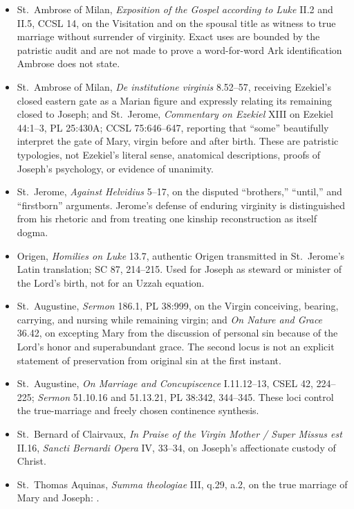 \begin{itemize}
  \item St.~Ambrose of Milan, \emph{Exposition of the Gospel according to Luke} II.2 and II.5, CCSL 14, on the Visitation and on the spousal title as witness to true marriage without surrender of virginity. Exact uses are bounded by the patristic audit and are not made to prove a word-for-word Ark identification Ambrose does not state.
  \item St.~Ambrose of Milan, \emph{De institutione virginis} 8.52--57, receiving Ezekiel's closed eastern gate as a Marian figure and expressly relating its remaining closed to Joseph; and St.~Jerome, \emph{Commentary on Ezekiel} XIII on Ezekiel 44:1--3, PL 25:430A; CCSL 75:646--647, reporting that ``some'' beautifully interpret the gate of Mary, virgin before and after birth.  These are patristic typologies, not Ezekiel's literal sense, anatomical descriptions, proofs of Joseph's psychology, or evidence of unanimity.
  \item St.~Jerome, \emph{Against Helvidius} 5--17, on the disputed ``brothers,'' ``until,'' and ``firstborn'' arguments.  Jerome's defense of enduring virginity is distinguished from his rhetoric and from treating one kinship reconstruction as itself dogma.
  \item Origen, \emph{Homilies on Luke} 13.7, authentic Origen transmitted in St.~Jerome's Latin translation; SC 87, 214--215.  Used for Joseph as steward or minister of the Lord's birth, not for an Uzzah equation.
  \item St.~Augustine, \emph{Sermon} 186.1, PL 38:999, on the Virgin conceiving, bearing, carrying, and nursing while remaining virgin; and \emph{On Nature and Grace} 36.42, on excepting Mary from the discussion of personal sin because of the Lord's honor and superabundant grace.  The second locus is not an explicit statement of preservation from original sin at the first instant.
  \item St.~Augustine, \emph{On Marriage and Concupiscence} I.11.12--13, CSEL 42, 224--225; \emph{Sermon} 51.10.16 and 51.13.21, PL 38:342, 344--345.  These loci control the true-marriage and freely chosen continence synthesis.
  \item St.~Bernard of Clairvaux, \emph{In Praise of the Virgin Mother / Super Missus est} II.16, \emph{Sancti Bernardi Opera} IV, 33--34, on Joseph's affectionate custody of Christ.
  \item St.~Thomas Aquinas, \emph{Summa theologiae} III, q.29, a.2, on the true marriage of Mary and Joseph: .

\end{itemize}

